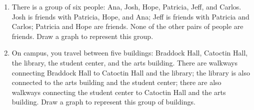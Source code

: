 \begin{enumerate}
\item There is a group of six people: Ana, Josh, Hope, Patricia, Jeff, and Carlos.  Josh is friends with Patricia, Hope, and Ana; Jeff is friends with Patricia and Carlos; Patricia and Hope are friends.  None of the other pairs of people are friends.  Draw a graph to represent this group.
\begin{center}
\end{center}

\item On campus, you travel between five buildings: Braddock Hall, Catoctin Hall, the library, the student center, and the arts building.  There are walkways connecting Braddock Hall to Catoctin Hall and the library; the library is also connected to the arts building and the student center; there are also walkways connecting the student center to Catoctin Hall and the arts building.  Draw a graph to represent this group of buildings.
\begin{center}
\end{center}


\end{enumerate}
